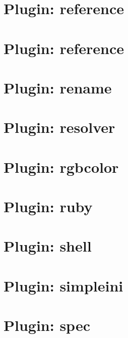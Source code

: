 \let\mypdfximage\pdfximage\def\pdfximage{\immediate\mypdfximage}\documentclass[twoside]{book}
\newcommand{\+}{\discretionary{\mbox{\scriptsize$\hookleftarrow$}}{}{}}
\begin{document}
\chapter{Plugin\+: reference}
\label{md_src_plugins_reference_examples_complex_README}

\chapter{Plugin\+: reference}
\label{md_src_plugins_reference_README}

\chapter{Plugin\+: rename}
\label{md_src_plugins_rename_README}

\chapter{Plugin\+: resolver}
\label{md_src_plugins_resolver_README}

\chapter{Plugin\+: rgbcolor}
\label{md_src_plugins_rgbcolor_README}

\chapter{Plugin\+: ruby}
\label{md_src_plugins_ruby_README}

\chapter{Plugin\+: shell}
\label{md_src_plugins_shell_README}

\chapter{Plugin\+: simpleini}
\label{md_src_plugins_simpleini_README}

\chapter{Plugin\+: spec}
\label{md_src_plugins_spec_README}

\end{document}
